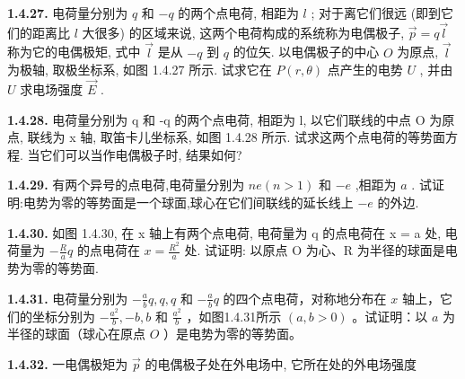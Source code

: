 \begin{center}
\end{center}

\vfill

\newpage
\textbf{1.4.27.} 电荷量分别为 $q$ 和 $-q$ 的两个点电荷, 相距为 $l$ ; 对于离它们很远 (即到它们的距离比 $l$ 大很多) 的区域来说, 这两个电荷构成的系统称为电偶极子, $\vec{p} = q\vec{l}$ 称为它的电偶极矩, 式中 $\vec{l}$ 是从 $-q$ 到 $q$ 的位矢. 以电偶极子的中心 $O$ 为原点, $\vec{l}$ 为极轴, 取极坐标系, 如图 1.4.27 所示. 试求它在 $P(r, \theta)$ 点产生的电势 $U$ , 并由 $U$ 求电场强度 $\vec{E}$ .


\begin{center}
\end{center}

\vfill

\textbf{1.4.28.} 电荷量分别为 q 和 -q 的两个点电荷, 相距为 l, 以它们联线的中点 O 为原点, 联线为 x 轴, 取笛卡儿坐标系, 如图 1.4.28 所示. 试求这两个点电荷的等势面方程. 当它们可以当作电偶极子时, 结果如何?

\vfill

\newpage
\textbf{1.4.29.} 有两个异号的点电荷,电荷量分别为 $ne(n > 1)$ 和 $-e$ ,相距为 $a$ . 试证明:电势为零的等势面是一个球面,球心在它们间联线的延长线上 $-e$ 的外边.

\vfill

\textbf{1.4.30.} 如图 1.4.30, 在 x 轴上有两个点电荷, 电荷量为 q 的点电荷在 x = a 处, 电荷量为 $\displaystyle -\frac{R}{a}q$ 的点电荷在 $\displaystyle x = \frac{R^{2}}{a}$ 处. 试证明: 以原点 O 为心、R 为半径的球面是电势为零的等势面.


\begin{center}
\end{center}

\vfill

\newpage
\textbf{1.4.31.} 电荷量分别为 $\displaystyle -\frac{a}{b} q, q, q$ 和 $\displaystyle -\frac{a}{b} q$ 的四个点电荷，对称地分布在 $x$ 轴上，它们的坐标分别为 $\displaystyle -\frac{a^2}{b}, -b, b$ 和 $\displaystyle \frac{a^2}{b}$ ，如图1.4.31所示 $(a, b > 0)$ 。试证明：以 $a$ 为半径的球面（球心在原点 $O$ ）是电势为零的等势面。


\begin{center}
\end{center}

\vfill

\textbf{1.4.32.} 一电偶极矩为 $\vec{p}$ 的电偶极子处在外电场中, 它所在处的外电场强度


